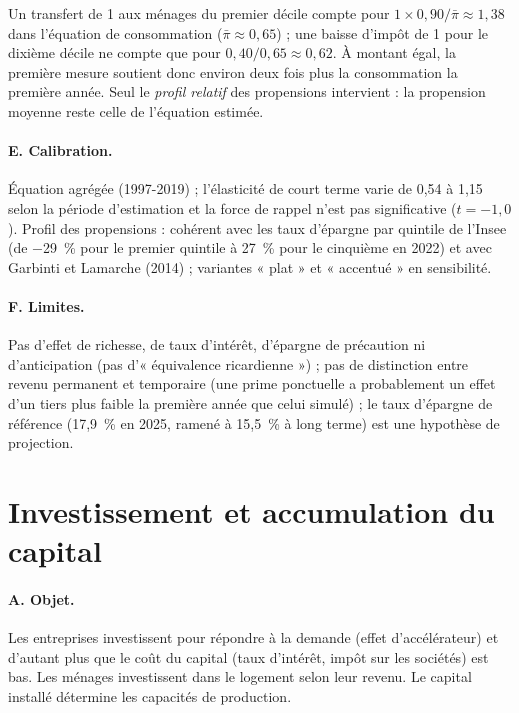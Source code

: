 \begin{exemple}
Un transfert de 1\md{} aux ménages du premier décile compte pour $1 \times 0{,}90/\bar\pi \approx 1{,}38$\md{} dans
l'équation de consommation ($\bar\pi \approx 0{,}65$) ; une baisse d'impôt de 1\md{} pour le dixième décile ne compte
que pour $0{,}40/0{,}65 \approx 0{,}62$\md. À montant égal, la première mesure soutient donc environ deux fois plus la
consommation la première année. Seul le \emph{profil relatif} des propensions intervient : la propension moyenne reste
celle de l'équation estimée.
\end{exemple}

\paragraph{E. Calibration.} Équation agrégée  (1997-2019) ; l'élasticité de court terme varie de 0,54 à 1,15
selon la période d'estimation et la force de rappel n'est pas significative ($t = -1{,}0$). Profil des propensions
 : cohérent avec les taux d'épargne par quintile de l'Insee (de $-$29~\% pour le premier quintile à 27~\% pour le
cinquième en 2022)  et avec Garbinti et Lamarche (2014) ; variantes
« plat » et « accentué » en sensibilité.

\paragraph{F. Limites.} Pas d'effet de richesse, de taux d'intérêt, d'épargne de précaution ni d'anticipation
(pas d'« équivalence ricardienne ») ; pas de distinction entre revenu permanent et temporaire (une prime ponctuelle a
probablement un effet d'un tiers plus faible la première année que celui simulé) ; le taux d'épargne de référence
(17,9~\% en 2025, ramené à 15,5~\% à long terme) est une hypothèse de projection.

\section{Investissement et accumulation du capital}
\label{sec:invest}

\paragraph{A. Objet.} Les entreprises investissent pour répondre à la demande (effet d'accélérateur) et d'autant plus que
le coût du capital (taux d'intérêt, impôt sur les sociétés) est bas. Les ménages investissent dans le logement selon
leur revenu. Le capital installé détermine les capacités de production.

